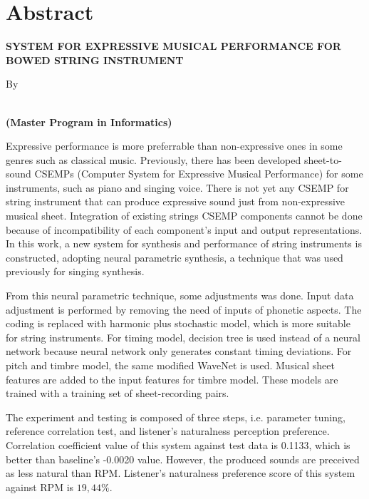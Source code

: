 \clearpage
\chapter*{Abstract}
\begin{center}
	\singlespacing
    \large \bfseries \MakeUppercase{System for Expressive Musical Performance for Bowed String Instrument} %

    \normalsize \normalfont By

    \bfseries \large \theauthor\\
    \normalsize (Master Program in Informatics)
    \bigskip
\end{center}

\begin{singlespace}

Expressive performance is more preferrable than non-expressive ones in some genres such as classical music. Previously, there has been developed sheet-to-sound CSEMPs (Computer System for Expressive Musical Performance) for some instruments, such as piano and singing voice. There is not yet any CSEMP for string instrument that can produce expressive sound just from non-expressive musical sheet. Integration of existing strings CSEMP components cannot be done because of incompatibility of each component's input and output representations. In this work, a new system for synthesis and performance of string instruments is constructed, adopting neural parametric synthesis, a technique that was used previously for singing synthesis.

From this neural parametric technique, some adjustments was done. Input data adjustment is performed by removing the need of inputs of phonetic aspects. The coding is replaced with harmonic plus stochastic model, which is more suitable for string instruments. For timing model, decision tree is used instead of a neural network because neural network only generates constant timing deviations. For pitch and timbre model, the same modified WaveNet is used. Musical sheet features are added to the input features for timbre model. These models are trained with a training set of sheet-recording pairs.

The experiment and testing is composed of three steps, i.e. parameter tuning, reference correlation test, and listener's naturalness perception preference. Correlation coefficient value of this system against test data is 0.1133, which is better than baseline's -0.0020 value. However, the produced sounds are preceived as less natural than RPM. Listener's naturalness preference score of this system against RPM is $19,44\%$.

\end{singlespace}
\clearpage
